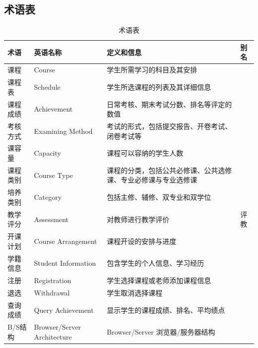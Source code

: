 \subsection{术语表}
  \begin{table}[H]
    \caption{术语表}
    \begin{tabularx}{\textwidth}{|l|l|X|l|}
    \hline
    \textbf{术语} & \textbf{英语名称} & \textbf{定义和信息} & \textbf{别名}\\
    \hline
    课程&Course&学生所需学习的科目及其安排&\\
    \hline
    课程表&Schedule&学生所选课程的列表及其详细信息&\\
    \hline
    课程成绩&Achievement&日常考核、期末考试分数、排名等评定的数值&\\
    \hline
    考核方式&Examining Method&考试的形式，包括提交报告、开卷考试、闭卷考试等&\\
    \hline
    课容量&Capacity&课程可以容纳的学生人数&\\
    \hline
    课程类别&Course Type&课程的分类，包括公共必修课、公共选修课、专业必修课与专业选修课&\\
    \hline
    培养类别&Category&包括主修、辅修、双专业和双学位&\\
    \hline
    教学评分&Assessment&对教师进行教学评价&评教\\
    \hline
    开课计划&Course Arrangement&课程开设的安排与进度&\\
    \hline
    学籍信息&Student Information&包含学生的个人信息、学习经历&\\
    \hline
    注册&Registration&学生选择课程或老师添加课程信息&\\
    \hline
    退选&Withdrawal&学生取消选择课程&\\
    \hline
    查询成绩&Query Achievement&显示学生的课程成绩、排名、平均绩点&\\
    \hline
    B/S结构&Browser/Server Architecture&Browser/Server 浏览器/服务器结构&\\
    \hline
  \end{tabularx}
  
\end{table}


